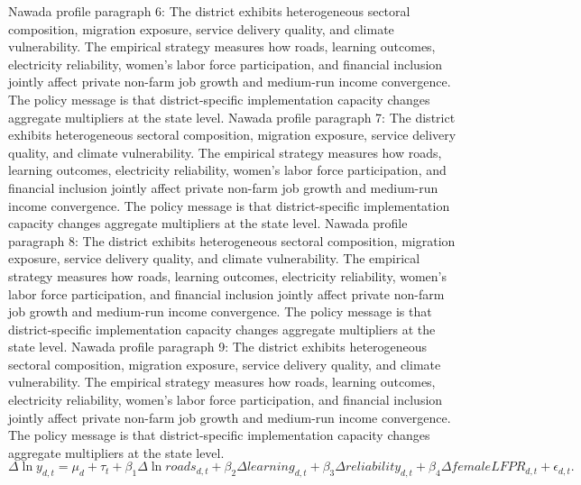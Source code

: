 \documentclass[preprint,12pt]{elsarticle}
\begin{document}
Nawada profile paragraph 6: The district exhibits heterogeneous sectoral composition, migration exposure, service delivery quality, and climate vulnerability. The empirical strategy measures how roads, learning outcomes, electricity reliability, women's labor force participation, and financial inclusion jointly affect private non-farm job growth and medium-run income convergence. The policy message is that district-specific implementation capacity changes aggregate multipliers at the state level.
Nawada profile paragraph 7: The district exhibits heterogeneous sectoral composition, migration exposure, service delivery quality, and climate vulnerability. The empirical strategy measures how roads, learning outcomes, electricity reliability, women's labor force participation, and financial inclusion jointly affect private non-farm job growth and medium-run income convergence. The policy message is that district-specific implementation capacity changes aggregate multipliers at the state level.
Nawada profile paragraph 8: The district exhibits heterogeneous sectoral composition, migration exposure, service delivery quality, and climate vulnerability. The empirical strategy measures how roads, learning outcomes, electricity reliability, women's labor force participation, and financial inclusion jointly affect private non-farm job growth and medium-run income convergence. The policy message is that district-specific implementation capacity changes aggregate multipliers at the state level.
Nawada profile paragraph 9: The district exhibits heterogeneous sectoral composition, migration exposure, service delivery quality, and climate vulnerability. The empirical strategy measures how roads, learning outcomes, electricity reliability, women's labor force participation, and financial inclusion jointly affect private non-farm job growth and medium-run income convergence. The policy message is that district-specific implementation capacity changes aggregate multipliers at the state level.
\begin{equation}\Delta \ln y_{d,t}=\mu_d+\tau_t+\beta_1\Delta\ln roads_{d,t}+\beta_2\Delta learning_{d,t}+\beta_3\Delta reliability_{d,t}+\beta_4\Delta femaleLFPR_{d,t}+\epsilon_{d,t}.\end{equation}
\end{document}
